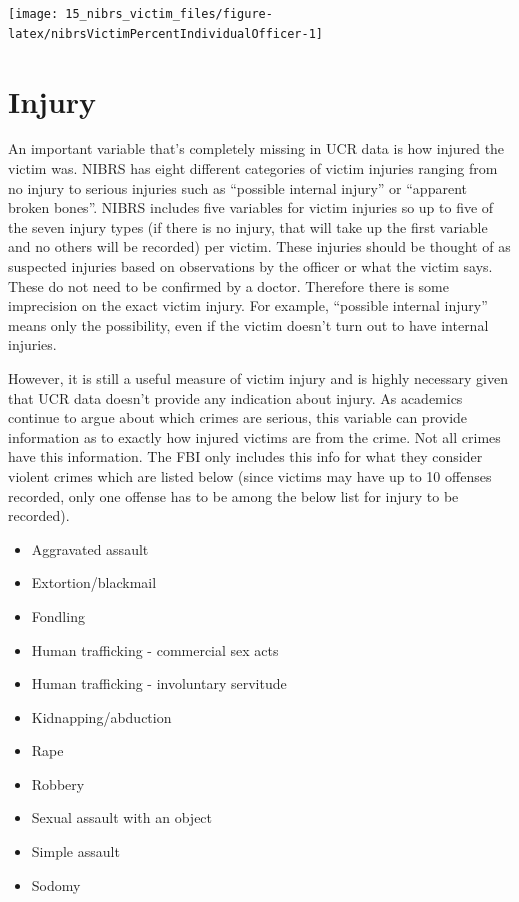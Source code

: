 \documentclass[
]{krantz}
\providecommand{\tightlist}{%
  \setlength{\itemsep}{0pt}\setlength{\parskip}{0pt}}
\let\origfigure\figure
\let\endorigfigure\endfigure
\renewenvironment{figure}[1][2] {
    \expandafter\origfigure\expandafter[H]
} {
    \endorigfigure
}
\begin{document}
\begin{figure}

{\centering \texttt{[image: 15\_nibrs\_victim\_files/figure-latex/nibrsVictimPercentIndividualOfficer-1]} 

}

\caption{Percent of victimizations whose victim type of 'law enforcement officer,' 'business,' or 'invidual,' 1991-2022.}\label{fig:nibrsVictimPercentIndividualOfficer}
\end{figure}

\section{Injury}\label{injury}

An important variable that's completely missing in UCR data
is how injured the victim was. NIBRS has eight different
categories of victim injuries ranging from no injury to
serious injuries such as ``possible internal injury'' or
``apparent broken bones''. NIBRS includes five variables for
victim injuries so up to five of the seven injury types (if
there is no injury, that will take up the first variable and
no others will be recorded) per victim. These injuries
should be thought of as suspected injuries based on
observations by the officer or what the victim says. These
do not need to be confirmed by a doctor. Therefore there is
some imprecision on the exact victim injury. For example,
``possible internal injury'' means only the possibility,
even if the victim doesn't turn out to have internal
injuries.

However, it is still a useful measure of victim injury and
is highly necessary given that UCR data doesn't provide any
indication about injury. As academics continue to argue
about which crimes are serious, this variable can provide
information as to exactly how injured victims are from the
crime. Not all crimes have this information. The FBI only
includes this info for what they consider violent crimes
which are listed below (since victims may have up to 10
offenses recorded, only one offense has to be among the
below list for injury to be recorded).

\begin{itemize}
\tightlist
\item
  Aggravated assault
\item
  Extortion/blackmail
\item
  Fondling
\item
  Human trafficking - commercial sex acts
\item
  Human trafficking - involuntary servitude
\item
  Kidnapping/abduction
\item
  Rape
\item
  Robbery
\item
  Sexual assault with an object
\item
  Simple assault
\item
  Sodomy
\end{itemize}
\end{document}
